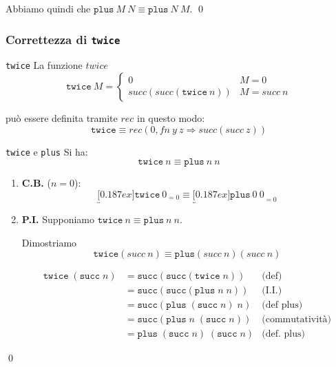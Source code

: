 \documentclass[a4paper,11pt]{report}
\begin{document}
Abbiamo quindi che \( \texttt{plus} \ M \ N \equiv \texttt{plus} \ N \ M \). \qed


\subsubsection{Correttezza di \texttt{twice}}

\begin{defframe}{\texttt{twice}}{}
    La funzione \( twice \) 
    \[ \texttt{twice} \ M  = \begin{cases}
        0 & M = 0\\
        succ(succ(\texttt{twice} \ n)) & M = succ \ n
    \end{cases}\]

    può essere definita tramite \( rec \) in questo modo:
    \[ \texttt{twice}\equiv rec(0, fn \ y \ z \Rightarrow succ (succ \ z))\]
\end{defframe}

\begin{lemmaframe}{\texttt{twice} e \texttt{plus}}{}
    Si ha:
    \[ \texttt{twice} \ n \equiv \texttt{plus} \ n \ n \]
\end{lemmaframe}

\begin{enumerate}
    \item \textbf{C.B.} (\( n = 0 \)): 
        \[ \underbracket[0.187ex]{\texttt{twice} \ 0}_{=0} \equiv \underbracket[0.187ex]{\texttt{plus} \ 0 \ 0}_{= 0} \]


    \item \textbf{P.I.}
        Supponiamo \( \texttt{twice} \ n \equiv \texttt{plus} \  n \ n \).

        Dimostriamo 
        \[ \texttt{twice}(succ \ n) \equiv \texttt{plus} (succ \ n ) (succ \ n) \]

        \[
            \begin{array}{rll}
                \mathtt{twice}\; (\mathtt{succ}\; n) & = \mathtt{succ}(\mathtt{succ}(\mathtt{twice}\; n)) & \text{(def)}\\
                                                     & = \mathtt{succ}(\mathtt{succ}(\mathtt{plus}\; n\; n)) & \text{(I.I.)} \\
                                                     & = \mathtt{succ}(\mathtt{plus}\; (\mathtt{succ}\; n)\; n) & \text{(def plus)} \\
                                                     & = \mathtt{succ}(\mathtt{plus}\; n\; (\mathtt{succ}\; n)) & \text{(commutatività)} \\
                                                     & = \mathtt{plus}\; (\mathtt{succ}\; n)\; (\mathtt{succ}\; n) & \text{(def. plus)}
            \end{array}
        \]
\end{enumerate}
\qed
\end{document}
